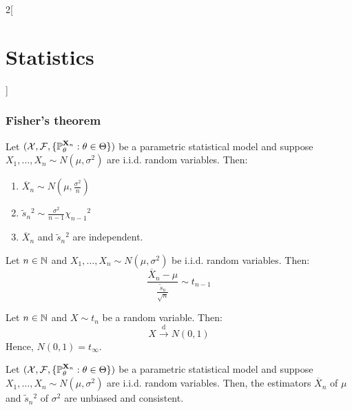 \documentclass[../../../main.tex]{subfiles}
\begin{document}
\begin{multicols}{2}[\section{Statistics}]
  \subsubsection{Fisher's theorem}
  \begin{theorem}
    Let $(\mathcal{X},\mathcal{F},\{\mathbb{P}_\theta^{\boldsymbol{\mathrm{X}}_n}:\theta\in\Theta\})$ be a parametric statistical model and suppose $X_1,\ldots,X_n\sim N(\mu,\sigma^2)$ are i.i.d. random variables. Then:
    \begin{enumerate}
      \item $\overline{X}_n\sim N\left(\mu,\frac{\sigma^2}{n}\right)$
      \item $\tilde{s}_n{}^2\sim\frac{\sigma^2}{n-1}{\chi_{n-1}}^2$
      \item $\overline{X}_n$ and $\tilde{s}_n{}^2$ are independent.
    \end{enumerate}
  \end{theorem}
  \begin{corollary}
    Let $n\in\mathbb{N}$ and $X_1,\ldots,X_n\sim N(\mu,\sigma^2)$ be i.i.d. random variables. Then: $$\frac{\overline{X}_n-\mu}{\frac{\tilde{s}_n}{\sqrt{n}}}\sim t_{n-1}$$
  \end{corollary}
  \begin{corollary}
    Let $n\in\mathbb{N}$ and $X\sim t_n$ be a random variable. Then: $$X\overset{\text{d}}{\longrightarrow }N\left(0,1\right)$$
    Hence, $N(0,1)=t_\infty$.
  \end{corollary}
  \begin{corollary}
    Let $(\mathcal{X},\mathcal{F},\{\mathbb{P}_\theta^{\boldsymbol{\mathrm{X}}_n}:\theta\in\Theta\})$ be a parametric statistical model and suppose $X_1,\ldots,X_n\sim N(\mu,\sigma^2)$ are i.i.d. random variables. Then, the estimators $\overline{X}_n$ of $\mu$ and $\tilde{s}_n{}^2$ of $\sigma^2$ are unbiased and consistent.
  \end{corollary}
  \begin{center}
    \begin{minipage}{\linewidth}
      \centering
      
    \end{minipage}
  \end{center}
\end{multicols}
\end{document}
